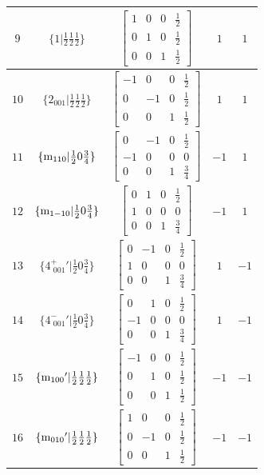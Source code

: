 \documentclass[fleqn,8pt]{jsarticle}
\begin{document}
\begin{longtable}{ccccc}
$ 9 $ & $ \{1|\frac{1}{2} \frac{1}{2} \frac{1}{2}\} $ & $ \begin{bmatrix} 1 & 0 & 0 & \frac{1}{2} \\ 0 & 1 & 0 & \frac{1}{2} \\ 0 & 0 & 1 & \frac{1}{2} \end{bmatrix} $ & $ 1 $ & $ 1 $ \\ \hline
$ 10 $ & $ \{2{}_{001}|\frac{1}{2} \frac{1}{2} \frac{1}{2}\} $ & $ \begin{bmatrix} -1 & 0 & 0 & \frac{1}{2} \\ 0 & -1 & 0 & \frac{1}{2} \\ 0 & 0 & 1 & \frac{1}{2} \end{bmatrix} $ & $ 1 $ & $ 1 $ \\ \hline
$ 11 $ & $ \{{\rm m}_{110}|\frac{1}{2} 0 \frac{3}{4}\} $ & $ \begin{bmatrix} 0 & -1 & 0 & \frac{1}{2} \\ -1 & 0 & 0 & 0 \\ 0 & 0 & 1 & \frac{3}{4} \end{bmatrix} $ & $ -1 $ & $ 1 $ \\ \hline
$ 12 $ & $ \{{\rm m}_{1-10}|\frac{1}{2} 0 \frac{3}{4}\} $ & $ \begin{bmatrix} 0 & 1 & 0 & \frac{1}{2} \\ 1 & 0 & 0 & 0 \\ 0 & 0 & 1 & \frac{3}{4} \end{bmatrix} $ & $ -1 $ & $ 1 $ \\ \hline
$ 13 $ & $ \{4^{+}_{\,\,001}{}'|\frac{1}{2} 0 \frac{3}{4}\} $ & $ \begin{bmatrix} 0 & -1 & 0 & \frac{1}{2} \\ 1 & 0 & 0 & 0 \\ 0 & 0 & 1 & \frac{3}{4} \end{bmatrix} $ & $ 1 $ & $ -1 $ \\ \hline
$ 14 $ & $ \{4^{-}_{\,\,001}{}'|\frac{1}{2} 0 \frac{3}{4}\} $ & $ \begin{bmatrix} 0 & 1 & 0 & \frac{1}{2} \\ -1 & 0 & 0 & 0 \\ 0 & 0 & 1 & \frac{3}{4} \end{bmatrix} $ & $ 1 $ & $ -1 $ \\ \hline
$ 15 $ & $ \{{\rm m}_{100}{}'|\frac{1}{2} \frac{1}{2} \frac{1}{2}\} $ & $ \begin{bmatrix} -1 & 0 & 0 & \frac{1}{2} \\ 0 & 1 & 0 & \frac{1}{2} \\ 0 & 0 & 1 & \frac{1}{2} \end{bmatrix} $ & $ -1 $ & $ -1 $ \\ \hline
$ 16 $ & $ \{{\rm m}_{010}{}'|\frac{1}{2} \frac{1}{2} \frac{1}{2}\} $ & $ \begin{bmatrix} 1 & 0 & 0 & \frac{1}{2} \\ 0 & -1 & 0 & \frac{1}{2} \\ 0 & 0 & 1 & \frac{1}{2} \end{bmatrix} $ & $ -1 $ & $ -1 $ \\
\end{longtable}
\end{document}
